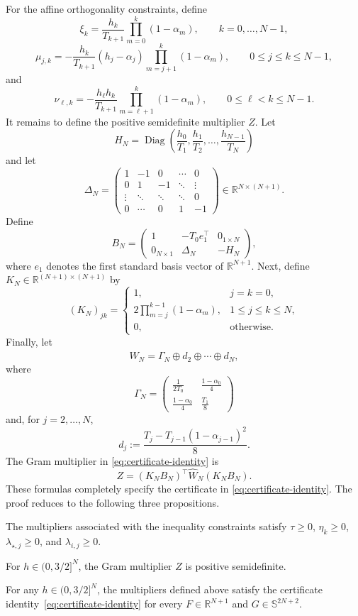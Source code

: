 For the affine orthogonality constraints, define
\[ \xi_k = \frac{h_k}{T_{k+1}} \prod_{m=0}^{k}(1-\alpha_m),
\qquad k=0,\ldots,N-1, \]
\[ \mu_{j,k} = - \frac{h_k}{T_{k+1}} (h_j-\alpha_j) \prod_{m=j+1}^{k}(1-\alpha_m), \qquad 0\leq j\leq k\leq N-1, \]
and \[ \nu_{\ell,k} = - \frac{h_\ell h_k}{T_{k+1}} \prod_{m=\ell+1}^{k}(1-\alpha_m), \qquad 0\leq\ell<k\leq N-1. \]
It remains to define the positive semidefinite multiplier $Z$. Let
\[H_N = \operatorname{Diag} \left( \frac{h_0}{T_1}, \frac{h_1}{T_2},
\ldots, \frac{h_{N-1}}{T_N} \right) \]
and let \[ \Delta_N =
\begin{pmatrix}
1&-1&0&\cdots&0\\
0&1&-1&\ddots&\vdots\\
\vdots&\ddots&\ddots&\ddots&0\\
0&\cdots&0&1&-1
\end{pmatrix}
\in\mathbb R^{N\times(N+1)}. \]
Define \[ B_N =
\begin{pmatrix}
1 & -T_0 e_1^\top & 0_{1\times N}\\
0_{N\times1} & \Delta_N & -H_N
\end{pmatrix}, \]
where $e_1$ denotes the first standard basis vector of
$\mathbb R^{N+1}$.
Next, define $K_N\in\mathbb R^{(N+1)\times(N+1)}$ by
\[ (K_N)_{jk} = \begin{cases} 1, &j=k=0, \\[0.4em]
\displaystyle 2\prod_{m=j}^{k-1}(1-\alpha_m),
&1\leq j\leq k\leq N, \\[0.6em] 0,
&\text{otherwise}. \end{cases} \]
Finally, let
\[\widehat W_N = \Gamma_N\oplus d_2\oplus\cdots\oplus d_N, \]
where
\[ \Gamma_N = \begin{pmatrix} \displaystyle\frac{1}{2T_0} & \displaystyle\frac{1-\alpha_0}{4} \\[0.7em]
\displaystyle\frac{1-\alpha_0}{4}
& \displaystyle\frac{T_1}{8}
\end{pmatrix} \]
and, for $j=2,\ldots,N$,
\[ d_j := \frac{ T_j-T_{j-1}(1-\alpha_{j-1})^2 }{8}. \]
The Gram multiplier in \eqref{eq:certificate-identity} is
\[ Z = (K_NB_N)^\top \widehat W_N (K_NB_N). \]
These formulas completely specify the certificate in \eqref{eq:certificate-identity}. The proof reduces to the following three propositions.
\begin{proposition}\label{prop:nonnegative-multipliers}
The multipliers associated with the inequality constraints satisfy $\tau\ge0$, $\eta_k\ge0$, $\lambda_{\star,j}\ge0$, and $\lambda_{i,j}\ge0$.
\end{proposition}
\begin{proposition}\label{prop:psd-gram-multiplier}
For $h\in (0,3/2]^N$, the Gram multiplier $Z$ is positive semidefinite.
\end{proposition}
\begin{proposition}\label{prop:certificate-identity}
For any $h\in(0,3/2]^N$, the multipliers defined above satisfy the certificate identity~\eqref{eq:certificate-identity} for every $F\in\mathbb R^{N+1}$ and $G\in \mathbb{S}^{2N+2}$.
\end{proposition}
